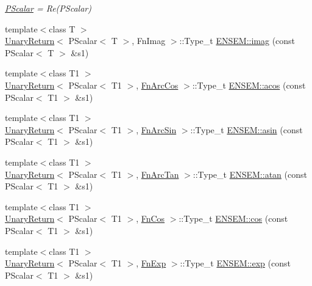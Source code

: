 \begin{DoxyCompactItemize}
\begin{DoxyCompactList}\small\item\em \mbox{\hyperlink{classENSEM_1_1PScalar}{P\+Scalar}} = Re(\+P\+Scalar) \end{DoxyCompactList}\item 
{\footnotesize template$<$class T $>$ }\\\mbox{\hyperlink{structUnaryReturn}{Unary\+Return}}$<$ P\+Scalar$<$ T $>$, Fn\+Imag $>$\+::Type\+\_\+t \mbox{\hyperlink{group__primscalar_ga81e1ff1466afc27ec3d09728fc37d340}{E\+N\+S\+E\+M\+::imag}} (const P\+Scalar$<$ T $>$ \&s1)
\item 
{\footnotesize template$<$class T1 $>$ }\\\mbox{\hyperlink{structUnaryReturn}{Unary\+Return}}$<$ P\+Scalar$<$ T1 $>$, \mbox{\hyperlink{structFnArcCos}{Fn\+Arc\+Cos}} $>$\+::Type\+\_\+t \mbox{\hyperlink{group__primscalar_gac925d7a5363870efbfc14f80cbe15d63}{E\+N\+S\+E\+M\+::acos}} (const P\+Scalar$<$ T1 $>$ \&s1)
\item 
{\footnotesize template$<$class T1 $>$ }\\\mbox{\hyperlink{structUnaryReturn}{Unary\+Return}}$<$ P\+Scalar$<$ T1 $>$, \mbox{\hyperlink{structFnArcSin}{Fn\+Arc\+Sin}} $>$\+::Type\+\_\+t \mbox{\hyperlink{group__primscalar_ga66e19f88731b0ca161e7ecb7a3d4ea94}{E\+N\+S\+E\+M\+::asin}} (const P\+Scalar$<$ T1 $>$ \&s1)
\item 
{\footnotesize template$<$class T1 $>$ }\\\mbox{\hyperlink{structUnaryReturn}{Unary\+Return}}$<$ P\+Scalar$<$ T1 $>$, \mbox{\hyperlink{structFnArcTan}{Fn\+Arc\+Tan}} $>$\+::Type\+\_\+t \mbox{\hyperlink{group__primscalar_gad0db281b26948d9de5a2de123a357fe5}{E\+N\+S\+E\+M\+::atan}} (const P\+Scalar$<$ T1 $>$ \&s1)
\item 
{\footnotesize template$<$class T1 $>$ }\\\mbox{\hyperlink{structUnaryReturn}{Unary\+Return}}$<$ P\+Scalar$<$ T1 $>$, \mbox{\hyperlink{structFnCos}{Fn\+Cos}} $>$\+::Type\+\_\+t \mbox{\hyperlink{group__primscalar_ga0d6f04344bee0fa65f96047c4c9e2fa3}{E\+N\+S\+E\+M\+::cos}} (const P\+Scalar$<$ T1 $>$ \&s1)
\item 
{\footnotesize template$<$class T1 $>$ }\\\mbox{\hyperlink{structUnaryReturn}{Unary\+Return}}$<$ P\+Scalar$<$ T1 $>$, \mbox{\hyperlink{structFnExp}{Fn\+Exp}} $>$\+::Type\+\_\+t \mbox{\hyperlink{group__primscalar_ga82558f162d1959eca11c01ad753fc3a1}{E\+N\+S\+E\+M\+::exp}} (const P\+Scalar$<$ T1 $>$ \&s1)
\item 

\end{DoxyCompactItemize}
